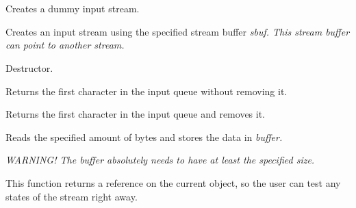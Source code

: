 \section{}\label{wxinputstream}







Creates a dummy input stream.


Creates an input stream using the specified stream buffer \it{sbuf}. This
stream buffer can point to another stream.



Destructor.



Returns the first character in the input queue without removing it.



Returns the first character in the input queue and removes it.



Reads the specified amount of bytes and stores the data in \it{buffer}.

\it{WARNING!} The buffer absolutely needs to have at least the specified size.

This function returns a reference on the current object, so the user can test
any states of the stream right away.


